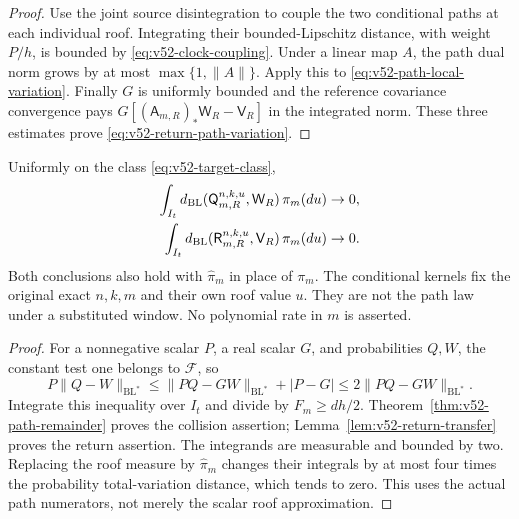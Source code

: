 \begin{proof}
Use the joint source disintegration to couple the two conditional
paths at each individual roof. Integrating their bounded-Lipschitz
distance, with weight $P/h$, is bounded by
\eqref{eq:v52-clock-coupling}. Under a linear map $A$, the path dual
norm grows by at most $\max\{1,\|A\|\}$. Apply this to
\eqref{eq:v52-path-local-variation}. Finally $G$ is uniformly bounded
and the reference covariance convergence pays
$G[(\mathsf A_{m,R})_*\mathsf W_R-\mathsf V_R]$ in the integrated norm.
These three estimates prove \eqref{eq:v52-return-path-variation}.
\end{proof}

\begin{theorem}
\label{thm:v52-same-roof-mean}
Uniformly on the class \eqref{eq:v52-target-class},
\begin{align}
 \int_{I_t}d_{\rm BL}(\mathsf Q_{m,R}^{n,k,u},\mathsf W_R)
                                                   \,\pi_m(du)&\to0,
                                             \label{eq:v52-collision-kernel-mean}\\
 \int_{I_t}d_{\rm BL}(\mathsf R_{m,R}^{n,k,u},\mathsf V_R)
                                                   \,\pi_m(du)&\to0.
                                             \label{eq:v52-return-kernel-mean}
\end{align}
Both conclusions also hold with $\widehat\pi_m$ in place of $\pi_m$.
The conditional kernels fix the original exact $n,k,m$ and their own
roof value $u$. They are not the path law under a substituted window.
No polynomial rate in $m$ is asserted.
\end{theorem}
\begin{proof}
For a nonnegative scalar $P$, a real scalar $G$, and probabilities
$Q,W$, the constant test one belongs to $\mathcal F$, so
\[
 P\|Q-W\|_{\mathrm{BL}^*}
 \le\|PQ-GW\|_{\mathrm{BL}^*}+|P-G|
 \le2\|PQ-GW\|_{\mathrm{BL}^*}.
\]
Integrate this inequality over $I_t$ and divide by $F_m\ge dh/2$.
Theorem~\ref{thm:v52-path-remainder} proves the collision assertion;
Lemma~\ref{lem:v52-return-transfer} proves the return assertion.
The integrands are measurable and bounded by two. Replacing the
roof measure by $\widehat\pi_m$ changes their integrals by at most
four times the probability total-variation distance, which tends
to zero. This uses the actual path numerators, not merely the
scalar roof approximation.
\end{proof}

